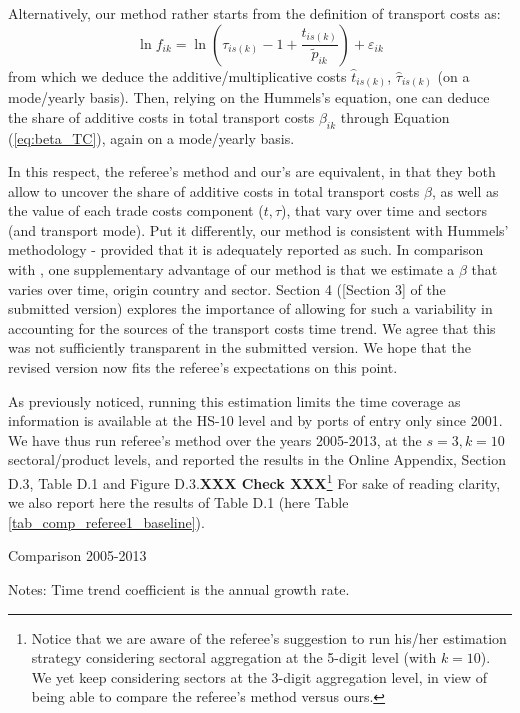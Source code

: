 \documentclass[a4paper,11pt]{article}
\begin{document}
\begin{itemize}
 Alternatively, our method rather starts from the definition of transport costs as:
     $$\ln f_{ik} = \ln\left(\tau_{is(k)} -1 + \frac{t_{is(k)}}{\widetilde{p}_{ik}}\right) +\varepsilon_{ik}$$
\noindent from which we deduce the additive/multiplicative costs $\widehat{t}_{is(k)}$, $\widehat{\tau}_{is(k)}$ (on a mode/yearly basis). Then, relying on the Hummels's equation, one can deduce the share of additive costs in total transport costs $\beta_{ik}$ through Equation (\ref{eq:beta_TC}), again on a mode/yearly basis.


In this respect, the referee's method and our's are equivalent, in that they both allow to uncover the share of additive costs in total transport costs $\beta$, as well as the value of each trade costs component ($t,\tau$), that vary over time and sectors (and transport mode). Put it differently, our method is consistent with Hummels' methodology - provided that it is adequately reported as such. In comparison with \cite{hummels2007}, one supplementary advantage of our method is that we estimate a $\beta$ that varies over time, origin country and sector. Section 4 ([Section 3] of the submitted version) explores the importance of allowing for such a variability in accounting for the sources of the transport costs time trend. We agree that this was not sufficiently transparent in the submitted version. We hope that the revised version now fits the referee's expectations on this point.

\end{itemize}

As previously noticed, running this estimation limits the time coverage as information is available at the HS-10 level and by ports of entry only since 2001. We have thus run referee's method over the years 2005-2013, at the $s=3, k=10$ sectoral/product levels, and reported the results in the Online Appendix, Section D.3, Table D.1 and Figure D.3.\textbf{XXX Check XXX}\footnote{Notice that we are aware of the referee's suggestion to run his/her estimation strategy considering sectoral aggregation at the 5-digit level (with $k=10$). We yet keep considering sectors at the 3-digit aggregation level, in view of being able to compare the referee's method versus ours.} For sake of reading clarity, we also report here the results of Table D.1 (here Table \ref{tab_comp_referee1_baseline}).

\begin{table}[htbp]
	\caption{Comparison 2005-2013}
	\begin{center}		
		
	
{\parbox[l]{12cm}{ \vspace{4pt}\footnotesize{Notes: Time trend coefficient is the annual growth rate.}}}
\end{center}
	\label{tab_comp_referee1_baseline}%
\end{table}%
\end{document}
